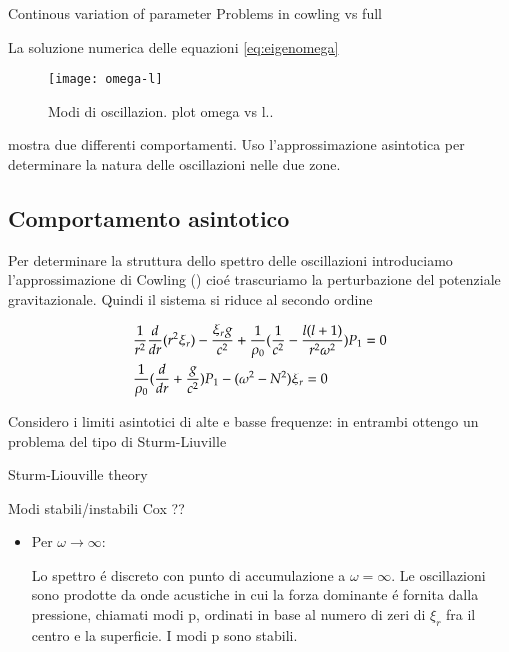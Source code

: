 \documentclass[oneside,12pt,fleqn]{memoir}
\begin{document}
{\begin{todo}{Continous variation of parameter}
Problems in cowling vs full
\end{todo}

La soluzione numerica delle equazioni \eqref{eq:eigenomega}



\begin{figure}[!ht]
\centering
\texttt{[image: omega-l]}
\caption{Modi di oscillazion. plot omega vs l..}
\end{figure}

mostra due differenti comportamenti. Uso l'approssimazione asintotica per determinare la natura delle oscillazioni nelle due zone.

\clearpage

\subsection{Comportamento asintotico}


Per determinare la struttura dello spettro delle oscillazioni introduciamo l'approssimazione di Cowling (\cite{cow41oscillations}) cio\'e trascuriamo la perturbazione del potenziale gravitazionale. Quindi il sistema si riduce al secondo ordine

\begin{align}
&\frac{1}{r^2}\frac{d}{d r}(r^2\xi_r)-\frac{\xi_rg}{c^2}+\frac{1}{\rho_0}(\frac{1}{c^2}-\frac{l(l+1)}{r^2\omega^2})P_1=0\label{eq:cowosc}\\
&\frac{1}{\rho_0}(\frac{d}{d r}+\frac{g}{c^2})P_1-(\omega^2-N^2)\xi_r=0\nonumber
\end{align}

Considero i limiti asintotici di alte e basse frequenze: in entrambi ottengo un problema del tipo di Sturm-Liuville

\begin{todo}{Sturm-Liouville theory}
\end{todo}

\begin{todo}{Modi stabili/instabili}
Cox ??
\end{todo}

\begin{itemize}
\item Per $\omega\to\infty$:

Lo spettro \'e discreto con punto di accumulazione a $\omega=\infty$.
Le oscillazioni sono prodotte da onde acustiche in cui la forza dominante \'e fornita dalla pressione, chiamati modi p, ordinati in base al numero di zeri di $\xi_r$ fra il centro e la superficie. I modi p sono stabili.


\end{itemize}}
\end{document}
